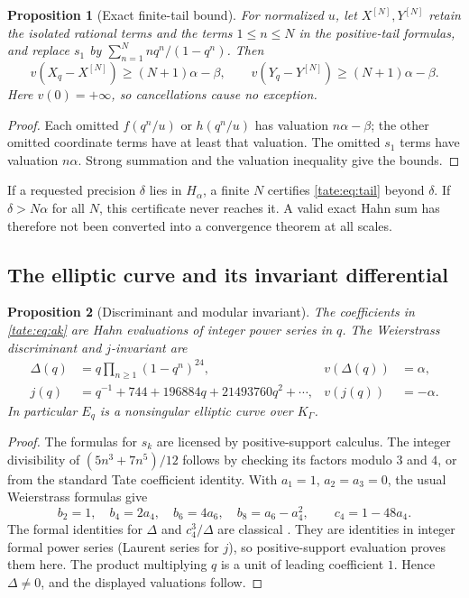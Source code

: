 \documentclass[11pt,letterpaper]{article}
\newtheorem{proposition}[proposition]{Proposition}
\theoremstyle{definition}
\begin{document}
\begin{proposition}[Exact finite-tail bound]\label{tate:prop:tail}
For normalized $u$, let $X^{[N]},Y^{[N]}$ retain the isolated rational
terms and the terms $1\le n\le N$ in the positive-tail formulas, and
replace $s_1$ by $\sum_{n=1}^N nq^n/(1-q^n)$. Then
\begin{equation}
 v(X_q-X^{[N]})\ge(N+1)\alpha-\beta,
 \qquad v(Y_q-Y^{[N]})\ge(N+1)\alpha-\beta.\label{tate:eq:tail}
\end{equation}
Here $v(0)=+\infty$, so cancellations cause no exception.
\end{proposition}

\begin{proof}
Each omitted $f(q^n/u)$ or $h(q^n/u)$ has valuation $n\alpha-\beta$;
the other omitted coordinate terms have at least that valuation.
The omitted $s_1$ terms have valuation $n\alpha$. Strong summation and
the valuation inequality give the bounds.
\end{proof}

If a requested precision $\delta$ lies in $H_\alpha$, a finite $N$
certifies \eqref{tate:eq:tail} beyond $\delta$. If $\delta>N\alpha$ for
all $N$, this certificate never reaches it. A valid exact Hahn sum has
therefore not been converted into a convergence theorem at all scales.

\subsection{The elliptic curve and its invariant differential}

\begin{proposition}[Discriminant and modular invariant]\label{tate:prop:discriminant}
The coefficients in \eqref{tate:eq:ak} are Hahn evaluations of integer
power series in $q$. The Weierstrass discriminant and $j$-invariant are
\begin{align}
 \Delta(q)&=q\prod_{n\ge1}(1-q^n)^{24},&v(\Delta(q))&=\alpha,
       \label{tate:eq:Delta}\\
 j(q)&=q^{-1}+744+196884q+21493760q^2+\cdots,&v(j(q))&=-\alpha.
       \label{tate:eq:j}
\end{align}
In particular $E_q$ is a nonsingular elliptic curve over $K_\Gamma$.
\end{proposition}

\begin{proof}
The formulas for $s_k$ are licensed by positive-support calculus.
The integer divisibility of $(5n^3+7n^5)/12$ follows by checking its
factors modulo $3$ and $4$, or from the standard Tate coefficient
identity. With $a_1=1$, $a_2=a_3=0$, the usual Weierstrass formulas give
\[
 b_2=1,\quad b_4=2a_4,\quad b_6=4a_6,\quad b_8=a_6-a_4^2,
 \qquad c_4=1-48a_4.
\]
The formal identities for $\Delta$ and $c_4^3/\Delta$ are classical
\cite{Tate,Silverman}. They are identities in integer formal power
series (Laurent series for $j$), so positive-support evaluation proves
them here. The product multiplying $q$ is a unit of leading coefficient
$1$. Hence $\Delta\ne0$, and the displayed valuations follow.
\end{proof}
\end{document}
